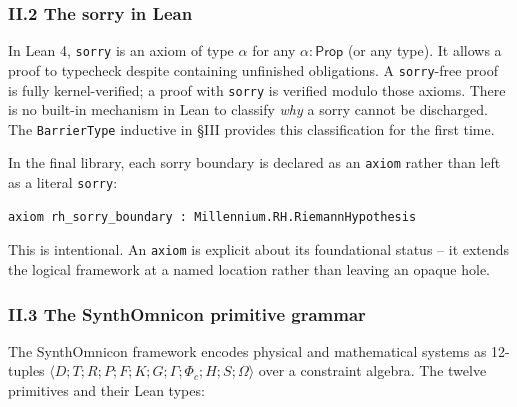 \documentclass[12pt,a4paper]{article}
\newcommand{\pilcrow}{\S}
\begin{document}
\subsubsection{II.2 The sorry in Lean}

In Lean 4, \texttt{sorry} is an axiom of type $\alpha$ for any $\alpha : \mathsf{Prop}$ (or any type). It allows a proof to typecheck despite containing unfinished obligations. A \texttt{sorry}-free proof is fully kernel-verified; a proof with \texttt{sorry} is verified modulo those axioms. There is no built-in mechanism in Lean to classify \emph{why} a sorry cannot be discharged. The \texttt{BarrierType} inductive in \pilcrow{}III provides this classification for the first time.

In the final library, each sorry boundary is declared as an \texttt{axiom} rather than left as a literal \texttt{sorry}:

\begin{lstlisting}[language=lean]
axiom rh_sorry_boundary : Millennium.RH.RiemannHypothesis
\end{lstlisting}

This is intentional. An \texttt{axiom} is explicit about its foundational status  --  it extends the logical framework at a named location rather than leaving an opaque hole.

\subsubsection{II.3 The SynthOmnicon primitive grammar}

The SynthOmnicon framework encodes physical and mathematical systems as 12-tuples $\langle D; T; R; P; F; K; G; \Gamma; \Phi_c; H; S; \Omega \rangle$ over a constraint algebra. The twelve primitives and their Lean types:
\end{document}
